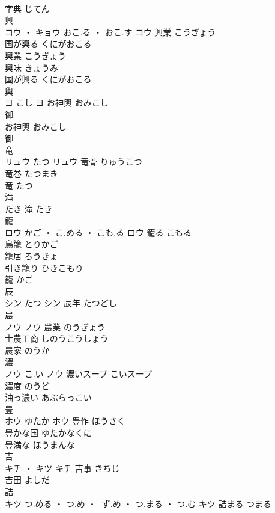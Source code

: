 \documentclass[8pt]{extreport}
\begin{document}
\begin{CJK}{UTF8}{min}
\\	字典	じてん	
\\	興	
\\	コウ ・ キョウ	おこ.る ・ おこ.す	コウ	興業	こうぎょう	
\\	国が興る	くにがおこる	
\\	興業	こうぎょう	
\\	興味	きょうみ	
\\	国が興る	くにがおこる	
\\	輿	
\\	ヨ	こし	ヨ	お神輿	おみこし	
\\	御 
\\	お神輿	おみこし	
\\	御 
\\	竜	
\\	リュウ	たつ	リュウ	竜骨	りゅうこつ	
\\	竜巻	たつまき	
\\	竜	たつ	
\\	滝	
\\	たき														滝	たき	
\\	籠	
\\	ロウ	かご ・ こ.める ・ こも.る	ロウ	籠る	こもる	
\\	鳥籠	とりかご	
\\	籠居	ろうきょ	
\\	引き籠り	ひきこもり	
\\	籠	かご	
\\	辰	
\\	シン	たつ	シン	辰年	たつどし	
\\	農	
\\	ノウ		ノウ	農業	のうぎょう	
\\	士農工商	しのうこうしょう	
\\	農家	のうか	
\\	濃	
\\	ノウ	こ.い	ノウ	濃いスープ	こいスープ	
\\	濃度	のうど	
\\	油っ濃い	あぶらっこい	
\\	豊	
\\	ホウ	ゆたか	ホウ	豊作	ほうさく	
\\	豊かな国	ゆたかなくに	
\\	豊満な	ほうまんな	
\\	吉	
\\	キチ ・ キツ		キチ	吉事	きちじ	
\\	吉田	よしだ	
\\	詰	
\\	キツ	つ.める ・ つ.め ・ -ず.め ・ つ.まる ・ つ.む	キツ	詰まる	つまる	

\end{CJK}
\end{document}
